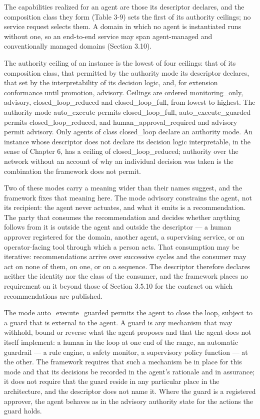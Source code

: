 The capabilities realized for an agent are those its descriptor
declares, and the composition class they form (Table 3-9) sets the first
of its authority ceilings; no service request selects them. A domain in
which no agent is instantiated runs without one, so an end-to-end
service may span agent-managed and conventionally managed domains
(Section 3.10).

The authority ceiling of an instance is the lowest of four ceilings:
that of its composition class, that permitted by the authority mode its
descriptor declares, that set by the interpretability of its decision
logic, and, for extension conformance until promotion, advisory.
Ceilings are ordered monitoring\_\allowbreak{}only, advisory,
closed\_\allowbreak{}loop\_\allowbreak{}reduced and
closed\_\allowbreak{}loop\_\allowbreak{}full, from lowest to highest.
The authority mode auto\_\allowbreak{}execute permits
closed\_\allowbreak{}loop\_\allowbreak{}full,
auto\_\allowbreak{}execute\_\allowbreak{}guarded permits
closed\_\allowbreak{}loop\_\allowbreak{}reduced, and
human\_\allowbreak{}approval\_\allowbreak{}required and advisory permit
advisory. Only agents of class closed\_\allowbreak{}loop declare an
authority mode. An instance whose descriptor does not declare its
decision logic interpretable, in the sense of Chapter 6, has a ceiling
of closed\_\allowbreak{}loop\_\allowbreak{}reduced; authority over the
network without an account of why an individual decision was taken is
the combination the framework does not permit.

Two of these modes carry a meaning wider than their names suggest, and
the framework fixes that meaning here. The mode advisory constrains the
agent, not its recipient: the agent never actuates, and what it emits is
a recommendation. The party that consumes the recommendation and decides
whether anything follows from it is outside the agent and outside the
descriptor --- a human approver registered for the domain, another
agent, a supervising service, or an operator-facing tool through which a
person acts. That consumption may be iterative: recommendations arrive
over successive cycles and the consumer may act on none of them, on one,
or on a sequence. The descriptor therefore declares neither the identity
nor the class of the consumer, and the framework places no requirement
on it beyond those of Section 3.5.10 for the contract on which
recommendations are published.

The mode auto\_\allowbreak{}execute\_\allowbreak{}guarded permits the
agent to close the loop, subject to a guard that is external to the
agent. A guard is any mechanism that may withhold, bound or reverse what
the agent proposes and that the agent does not itself implement: a human
in the loop at one end of the range, an automatic guardrail --- a rule
engine, a safety monitor, a supervisory policy function --- at the
other. The framework requires that such a mechanism be in place for this
mode and that its decisions be recorded in the agent's rationale and in
assurance; it does not require that the guard reside in any particular
place in the architecture, and the descriptor does not name it. Where
the guard is a registered approver, the agent behaves as in the advisory
authority state for the actions the guard holds.

